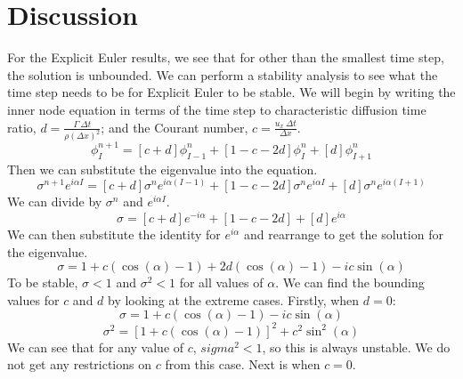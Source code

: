 \documentclass[12pt]{article}
\begin{document}
\section{Discussion}
For the Explicit Euler results, we see that for other than the smallest time step, the solution is unbounded. We can perform a stability analysis to see what the time step needs to be for Explicit Euler to be stable. We will begin by writing the inner node equation in terms of the time step to characteristic diffusion time ratio, $d=\frac{\Gamma\:\Delta t}{\rho\left(\Delta x\right)^2}$; and the Courant number, $c=\frac{u_x\:\Delta t}{\Delta x}$.
\begin{equation*}
    \phi_{I}^{n+1} = \left[ c + d \right]\phi_{I-1}^{n} + \left[ 1-c-2d \right]\phi_{I}^{n} + \left[ d \right]\phi_{I+1}^{n}
\end{equation*}
Then we can substitute the eigenvalue into the equation.
\begin{equation*}
    \sigma^{n+1} e^{i\alpha I} = \left[ c + d \right]\sigma^{n} e^{i\alpha \left(I-1\right)} + \left[ 1-c-2d \right]\sigma^{n} e^{i\alpha I} + \left[ d \right]\sigma^{n} e^{i\alpha \left(I+1\right)}
\end{equation*}
We can divide by $\sigma^n$ and $e^{i\alpha I}$.
\begin{equation*}
    \sigma = \left[ c + d \right] e^{-i\alpha} + \left[ 1-c-2d \right] + \left[ d \right] e^{i\alpha}
\end{equation*}
We can then substitute the identity for $e^{i\alpha}$ and rearrange to get the solution for the eigenvalue.
\begin{equation}
    \sigma = 1 + c \left( \cos\left( \alpha \right) - 1 \right) + 2d \left( \cos\left( \alpha \right) - 1 \right) - ic\sin\left( \alpha \right)
    \label{eq:eigenvalue}
\end{equation}
To be stable, $\sigma < 1$ and $\sigma^2 < 1$ for all values of $\alpha$. We can find the bounding values for $c$ and $d$ by looking at the extreme cases. Firstly, when $d=0$:
\begin{equation*}
    \sigma = 1 + c \left( \cos\left( \alpha \right) - 1 \right) - ic\sin\left( \alpha \right)
\end{equation*}
\begin{equation*}
    \sigma^2 = \left[ 1 + c \left( \cos\left( \alpha \right) - 1 \right) \right]^2 + c^2\sin^2\left( \alpha \right)
\end{equation*}
We can see that for any value of $c$, $sigma^2 < 1$, so this is always unstable. We do not get any restrictions on $c$ from this case. Next is when $c=0$.
\end{document}
